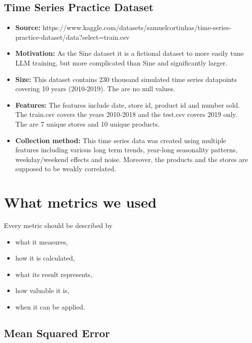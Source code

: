 \subsection{Time Series Practice Dataset}
\begin{itemize}


	\item \textbf{Source:} https://www.kaggle.com/datasets/samuelcortinhas/time-series-practice-dataset/data?select=train.csv
	\item \textbf{Motivation:} As the Sine dataset it is a fictional dataset to more easily tune LLM training, but more complicated than Sine and significantly larger.
	\item \textbf{Size:} This dataset contains 230 thousand simulated time series datapoints covering 10 years (2010-2019).  The are no null values.
	\item \textbf{Features:} The features include date, store id, product id and number sold. The train.csv covers the years 2010-2018 and the test.csv covers 2019 only. The are 7 unique stores and 10 unique products.
	\item \textbf{Collection method:} This time series data was created using multiple features including various long term trends, year-long seasonality patterns, weekday/weekend effects and noise. Moreover, the products and the stores are supposed to be weakly correlated.

\end{itemize}

\section{What metrics we used}
Every metric should be described by
\begin{itemize}
	\item what it measures,
	\item how it is calculated,
	\item what its result represents,
	\item how valuable it is,
	\item when it can be applied.
\end{itemize}
\subsection{Mean Squared Error}

